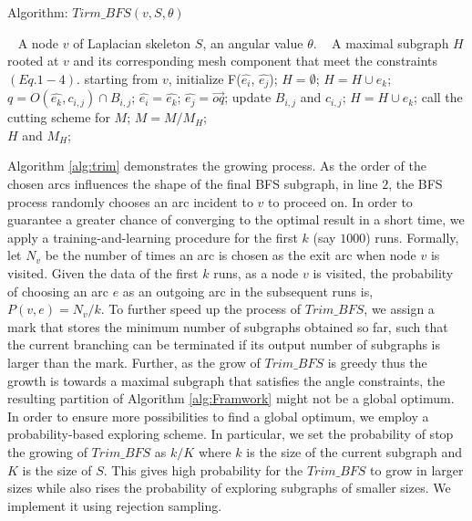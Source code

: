 \begin{algorithm}[h]
\caption{Algorithm: $Tirm\_BFS(v, S,\theta)$}
\label{alg:trim}
\begin{algorithmic}[1]
\REQUIRE~
A node $v$ of Laplacian skeleton $S$, an angular value $\theta$.
\ENSURE~
 A maximal subgraph $H$ rooted at $v$ and its corresponding mesh component that meet the constraints $(Eq.1-4)$.
\STATE starting from $v$, initialize F($\hat{e_i}$, $\hat{e_j}$); $H = \emptyset $;
  \STATE  $H = H \cup {e_k}$;
  \ENDIF
  \STATE $q = O( \hat{e_k}, c_{i,j}) \cap B_{i,j}$;
  \STATE  $\hat{e_i}=  \hat{e_k}$;
  \STATE $\hat{e_j} =  \overrightarrow{oq}$;
  \STATE  update $B_{i,j}$ and $c_{i,j}$;
  \STATE  $H = H \cup {e_k}$;
  \ENDIF
\ENDWHILE
\STATE  call the cutting scheme for $M$;
\STATE  $M= M/M_H$;
\label{code:fram:select} \\
\RETURN  $H$ and $M_H$;
\end{algorithmic}
\end{algorithm}

Algorithm \ref{alg:trim} demonstrates the growing process. As the order of the chosen arcs influences the shape of the final BFS subgraph, in line $2$, the BFS process randomly chooses an arc incident to $v$ to proceed on. In order to guarantee a greater chance of converging to the optimal result in a short time, we apply a training-and-learning procedure for the first $k$ (say $1000$) runs. Formally, let $N_v$ be the number of times an arc is chosen as the exit arc when node $v$ is visited. Given the data of the first $k$ runs, as a node $v$ is visited, the probability of choosing an arc $e$ as an outgoing arc in the subsequent runs is, $P(v, e) = N_v/k$. To further speed up the process of $Trim\_BFS$, we assign a mark that stores the minimum number of subgraphs obtained so far, such that the current branching can be terminated if its output number of subgraphs is larger than the mark. Further, as the grow of $Trim\_BFS$ is greedy thus the growth is towards a maximal subgraph that satisfies the angle constraints, the resulting partition of Algorithm \ref{alg:Framwork} might not be a global optimum. In order to ensure more possibilities to find a global optimum, we employ a probability-based exploring scheme. In particular, we set the probability of stop the growing of $Trim\_BFS$ as $k/K$ where $k$ is the size of the current subgraph and $K$ is the size of $S$. This gives high probability for the $Trim\_BFS$ to grow in larger sizes while also rises the probability of exploring subgraphs of smaller sizes. We implement it using rejection sampling.

